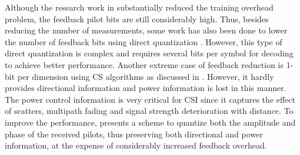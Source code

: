Although the research work in \cite{mainref-joint} \cite{ourwork} \cite{beamblock} substantially reduced the training overhead problem, the feedback pilot bits are still considerably high.  Thus, besides reducing the number of measurements, some work has also been done to lower the number of feedback bits using direct quantization \cite{Limited_feedback,limited-feedback_RWheath}. However, this type of direct quantization is complex and requires several bits per symbol for decoding to achieve better performance. Another extreme case of feedback reduction is 1-bit per dimension using CS algorithms as discussed in \cite{mainref-1bit}. However, it hardly provides directional information and power information is lost in this manner.  The power control information is very critical for CSI since it captures the effect of scatters, multipath fading and signal strength deterioration with distance. To improve the performance, \cite{beamblock} presents a scheme to quantize both the amplitude and phase of the received pilots, thus preserving both directional and power information, at the expense of considerably increased feedback overhead.

